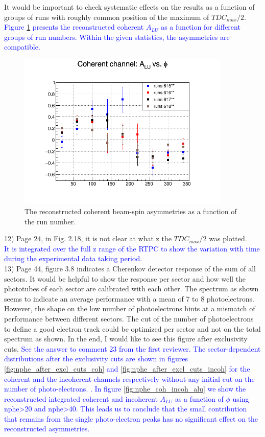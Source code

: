It would be important to check systematic effects on the results as a function 
of groups of runs with roughly common position of the maximum of 
$TDC_{max}/2$.\\
\textcolor{blue}{ Figure \ref{fig:coh_alu_run} presents the reconstructed 
coherent $A_{LU}$ as a function for different groups of run numbers. Within the 
given statistics, the asymmetries are compatible. }\\
\begin{figure}[h!]
\centering
\includegraphics[height=7.5cm]{fig/bsa_coherent_runs.png}
\caption{The reconstructed coherent beam-spin asymmetries as a function of the 
run number.}
\label{fig:coh_alu_run}
 \end{figure}




12) Page 24, in Fig. 2.18, it is not clear at what z the $TDC_{max}/2$ was 
plotted.\\
\textcolor{blue}{ It is integrated over the full z range of the RTPC to show 
the variation with time during the experimental data taking period.}\\

13) Page 44, figure 3.8 indicates a Cherenkov detector response of the sum of all 
sectors. It would be helpful to show the response per sector and how well the 
phototubes of each sector are calibrated with each other. The spectrum as shown 
seems to indicate an average performance with a mean of 7 to 8 photoelectrons. 
However, the shape on the low number of photoelectrons hints at a mismatch of 
performance between different sectors.  The cut of the number of photoelectrons 
to define a good electron track could be optimized per sector and not on the 
total spectrum as shown. In the end, I would like to see this figure after 
exclusivity cuts.
\textcolor{blue}{ See the answer to comment 23 from the first reviewer. The 
   sector-dependent distributions after the exclusivity cuts are shown in 
figures \ref{fig:nphe_after_excl_cuts_coh} and 
\ref{fig:nphe_after_excl_cuts_incoh} for the coherent and the incoherent 
channels respectively without any initial cut on the number of photo-electrons.  
. In figure \ref{fig:nphe_coh_incoh_alu} we show the reconstructed integrated 
coherent and incoherent $A_{LU}$ as a function of $\phi$ using nphe>20 and 
nphe>40. This leads us to conclude that the small contribution that remains 
from the single photo-electron peaks has no significant effect on the 
reconstructed asymmetries.}\\

